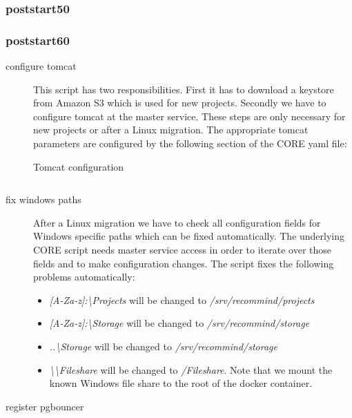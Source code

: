 			\subsubsection{poststart50}
			\subsubsection{poststart60}
			\begin{description}
				\item[configure tomcat] This script has two responsibilities. First it has to download a keystore from Amazon S3 which is used for new projects. Secondly we have to configure tomcat at the master service. These steps are only necessary for new projects or after a Linux migration. The appropriate tomcat parameters are configured by the following section of the CORE yaml file:
				
				\begin{listing}[H]
					\caption{Tomcat configuration}
					\label{lst:p01:ch02:core_tomcat_desc}
					\inputminted{yaml}{\relative{chapter_02/section_3.2/tomcat_example.yaml}}
				\end{listing}
				\item[fix windows paths] After a Linux migration we have to check all configuration fields for Windows specific paths which can be fixed automatically. The underlying CORE script needs master service access in order to iterate over those fields and to make configuration changes. The script fixes the following problems automatically:
				\begin{itemize}
					\item \emph{[A-Za-z]:\textbackslash Projects} will be changed to \emph{/srv/recommind/projects}
					\item \emph{[A-Za-z]:\textbackslash Storage} will be changed to \emph{/srv/recommind/storage}
					\item \emph{..\textbackslash Storage} will be changed to \emph{/srv/recommind/storage}
					\item \emph{\textbackslash \textbackslash Fileshare} will be changed to \emph{/Fileshare}. Note that we mount the known Windows file share to the root of the docker container.
				\end{itemize}
				\item[register pgbouncer]
			\end{description}
